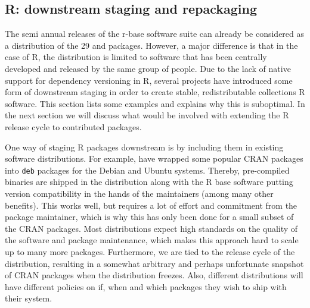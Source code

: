 \subsection{R: downstream staging and repackaging}

The semi annual releases of the r-base software suite can already be considered
as a distribution of the 29  and  packages.
However, a major difference is that in the case of R, the distribution is
limited to software that has been centrally developed and released by the same
group of people. Due to the lack of native support for dependency versioning in
R, several projects have introduced some form of downstream staging in order to
create stable, redistributable collections R software. This section lists some
examples and explains why this is suboptimal. In the next section we will
discuss what would be involved with extending the R release cycle to contributed
packages.

One way of staging R packages downstream is by including them in existing
software distributions. For example, \citet{cran2deb} have wrapped some popular
CRAN packages into \texttt{deb} packages for the Debian and Ubuntu systems.
Thereby, pre-compiled binaries are shipped in the distribution along with the R
base software putting version compatibility in the hands of the maintainers
(among many other benefits).
This works well, but requires a lot of effort and commitment from the package
maintainer, which is why this has only been done for a small subset of the CRAN
packages. Most distributions expect high standards on the quality of the
software and package maintenance, which makes this approach hard to scale up to
many more packages. Furthermore, we are tied to the release cycle of the
distribution, resulting in a somewhat arbitrary and perhaps unfortunate
snapshot of CRAN packages when the distribution freezes. Also, different
distributions will have different policies on if, when and which packages they
wish to ship with their system.

